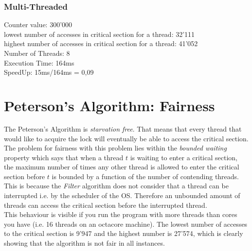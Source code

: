 \documentclass{article}
\begin{document}
\begin{adjustwidth}{2em}{2em}
\begin{adjustwidth}{2em}{2em}
			\subsubsection*{Multi-Threaded}
			\begin{adjustwidth}{2em}{2em}
				Counter value: 300'000 \\
				lowest number of accesses in critical section for a thread: 32'111 \\
				highest number of accesses in critical section for a thread: 41'052 \\
				Number of Threads: 8 \\
				Execution Time: 164ms \\
				SpeedUp: 15ms/164ms = 0,09
			\end{adjustwidth}
		\end{adjustwidth}
	\end{adjustwidth}
	
	\newpage
	
	\section{Peterson's Algorithm: Fairness}
	\begin{adjustwidth}{2em}{2em}
		The Peterson's Algorithm is \textit{starvation free}. That means that every thread that would like to acquire the lock will eventually be able to access the critical section. \\
		The problem for fairness with this problem lies within the \textit{bounded waiting} property which says that when a thread $t$ is waiting to enter a critical section, the maximum number of times any other thread is allowed to enter the critical section before $t$ is bounded by a function of the number of contending threads. This is because the \textit{Filter} algorithm does not consider that a thread can be interrupted i.e. by the scheduler of the OS. Therefore an unbounded amount of threads can access the critical section before the interrupted thread. \\
		This behaviour is visible if you run the program with more threads than cores you have (i.e. 16 threads on an octacore machine). The lowest number of accesses to the critical section is 9'947 and the highest number is 27'574, which is clearly showing that the algorithm is not fair in all instances.
	\end{adjustwidth}
	
\end{document}
